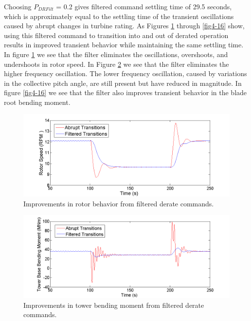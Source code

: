 Choosing $P_{DRFilt}$ = 0.2 gives filtered command settling time of 29.5 seconds, which is approximately equal to the settling time of the transient oscillations caused by abrupt changes in turbine rating. As Figures \ref{fig4-14} through \ref{fig4-16} show, using this filtered command to transition into and out of derated operation results in improved transient behavior while maintaining the same settling time. In figure \ref{fig4-14} we see that the filter eliminates the oscillations, overshoots, and undershoots in rotor speed. In Figure \ref{fig4-15} we see that the filter eliminates the higher frequency oscillation. The lower frequency oscillation, caused by variations in the collective pitch angle, are still present but have reduced in magnitude. In figure \ref{fig4-16} we see that the filter also improves transient behavior in the blade root bending moment.

\begin{figure}[htbp]
	\centering
		\includegraphics[trim = {1cm 0 2cm 0}, clip, width = \linewidth]{Figures/ch4Figures/fig4-14.png}
		
	\caption{Improvements in rotor behavior from filtered derate commands.}
	\label{fig4-14}
\end{figure}

\begin{figure}[htbp]
	\centering
		\includegraphics[trim = {1cm 0 2cm 0}, clip, width = \linewidth]{Figures/ch4Figures/fig4-15.png}
		
	\caption{Improvements in tower bending moment from filtered derate commands.}
	\label{fig4-15}
\end{figure}


